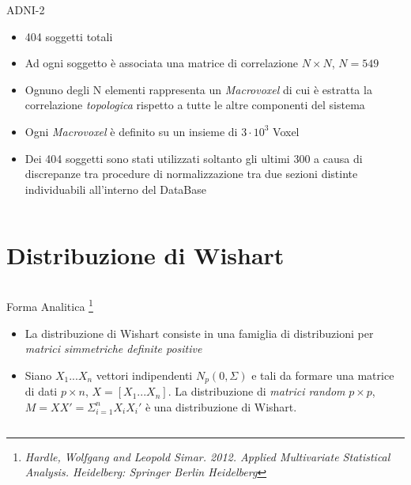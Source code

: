 \documentclass{beamer}
\begin{document}
\begin{frame}
\begin {columns}
\begin{column}{0.8\linewidth}
\begin{block}{ADNI-2}

\begin{itemize}
\item 404 soggetti totali

\item Ad ogni soggetto è associata una matrice di correlazione $N\times N$, $N=549$

\item Ognuno degli N elementi rappresenta un \textit{Macrovoxel} di cui è estratta la correlazione \textit{topologica} rispetto a tutte le altre componenti del sistema

\item Ogni \textit{Macrovoxel} è definito su un insieme di $3\cdot10^3$ Voxel

\item Dei 404 soggetti sono stati utilizzati soltanto gli ultimi 300 a causa di discrepanze tra procedure di normalizzazione tra due sezioni distinte individuabili all'interno del  DataBase

\end{itemize}


\end{block}


\end{column}
\end{columns}
\end{frame}

\section{Distribuzione di Wishart}

\begin{frame}
\begin {columns}
\begin{column}{0.8\linewidth}
\begin{block}{Forma Analitica \footnote{\textit{Hardle, Wolfgang and Leopold Simar. 2012. Applied Multivariate Statistical Analysis. Heidelberg: Springer Berlin Heidelberg}}}

\begin{itemize}
\item La distribuzione di Wishart consiste in una famiglia di distribuzioni per \textit{matrici simmetriche definite positive}

\item Siano $X_1...X_n$ vettori indipendenti $N_p(0,\Sigma)$ e tali da formare una matrice di dati $p\times n$, $X=[X_1...X_n]$.
La distribuzione di \textit{matrici random} $p\times p$, $M=XX'=\Sigma^n_{i=1}X_iX_i'$ è una distribuzione di Wishart.
\end{itemize}


\end{block}


\end{column}
\end{columns}
\end{frame}
\end{document}
